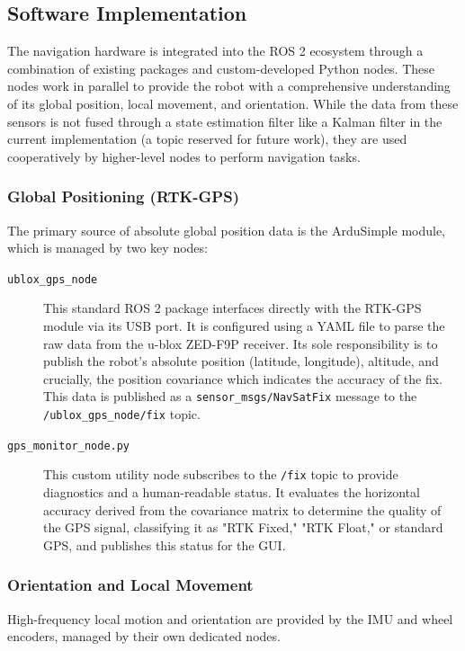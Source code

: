 \subsection{Software Implementation}
\label{ssec:nav_software}
The navigation hardware is integrated into the ROS 2 ecosystem through a combination of existing packages and custom-developed Python nodes. These nodes work in parallel to provide the robot with a comprehensive understanding of its global position, local movement, and orientation. While the data from these sensors is not fused through a state estimation filter like a Kalman filter in the current implementation (a topic reserved for future work), they are used cooperatively by higher-level nodes to perform navigation tasks.

\subsubsection{Global Positioning (RTK-GPS)}
The primary source of absolute global position data is the ArduSimple module, which is managed by two key nodes:

\begin{description}
    \item[\texttt{ublox\_gps\_node}] This standard ROS 2 package interfaces directly with the RTK-GPS module via its USB port. It is configured using a YAML file to parse the raw data from the u-blox ZED-F9P receiver. Its sole responsibility is to publish the robot's absolute position (latitude, longitude), altitude, and crucially, the position covariance which indicates the accuracy of the fix. This data is published as a \texttt{sensor\_msgs/NavSatFix} message to the \texttt{/ublox\_gps\_node/fix} topic.

    \item[\texttt{gps\_monitor\_node.py}] This custom utility node subscribes to the \texttt{/fix} topic to provide diagnostics and a human-readable status. It evaluates the horizontal accuracy derived from the covariance matrix to determine the quality of the GPS signal, classifying it as "RTK Fixed," "RTK Float," or standard GPS, and publishes this status for the GUI.
\end{description}

\subsubsection{Orientation and Local Movement}
High-frequency local motion and orientation are provided by the IMU and wheel encoders, managed by their own dedicated nodes.

